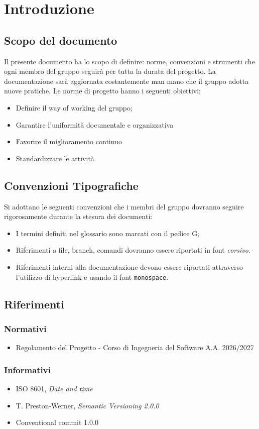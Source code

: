 \section{Introduzione}
\subsection{Scopo del documento}
Il presente documento ha lo scopo di definire: norme, convenzioni e strumenti che ogni membro del gruppo \textbf{\nomegruppo} seguirà per tutta la durata del progetto. La documentazione sarà aggiornata costantemente man mano che il gruppo adotta nuove pratiche. 
Le norme di progetto hanno i seguenti obiettivi:
\begin{itemize}
	\item Definire il way of working del gruppo;
	\item Garantire l'uniformità documentale e organizzativa
	\item Favorire il miglioramento continuo
	\item Standardizzare le attività
\end{itemize}

\subsection{Convenzioni Tipografiche}
Si adottano le seguenti convenzioni che i membri del gruppo dovranno seguire rigorosamente durante la stesura dei documenti:
\begin{itemize}
	\item I termini definiti nel glossario sono marcati con il pedice G;
	\item Riferimenti a file, branch, comandi dovranno essere riportati in font \textit{corsivo}.
	\item Riferimenti interni alla documentazione devono essere riportati attraverso l'utilizzo di hyperlink e usando il font \texttt{monospace}.
\end{itemize}

\subsection{Riferimenti}
\subsubsection{Normativi}
\begin{itemize}
		\item Regolamento del Progetto - Corso di Ingegneria del Software A.A. 2026/2027
\end{itemize}

\subsubsection{Informativi}
\begin{itemize}
	\item ISO 8601, \textit{Date and time}
	\item T. Preston-Werner, \textit{Semantic Versioning 2.0.0}
	\item Conventional commit 1.0.0
\end{itemize}
